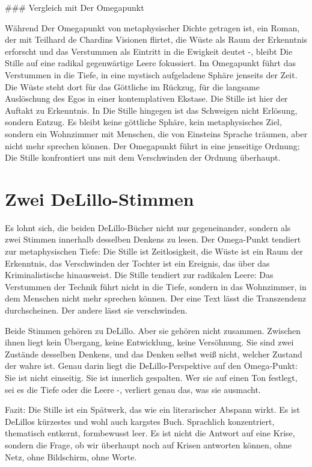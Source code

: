 \documentclass[
  ngerman,
]{article}
\begin{document}
\#\#\# Vergleich mit Der Omegapunkt

Während Der Omegapunkt von metaphysischer Dichte getragen ist, ein
Roman, der mit Teilhard de Chardins Visionen flirtet, die Wüste als Raum
der Erkenntnis erforscht und das Verstummen als Eintritt in die Ewigkeit
deutet -, bleibt Die Stille auf eine radikal gegenwärtige Leere
fokussiert. Im Omegapunkt führt das Verstummen in die Tiefe, in eine
mystisch aufgeladene Sphäre jenseits der Zeit. Die Wüste steht dort für
das Göttliche im Rückzug, für die langsame Auslöschung des Egos in einer
kontemplativen Ekstase. Die Stille ist hier der Auftakt zu Erkenntnis.
In Die Stille hingegen ist das Schweigen nicht Erlösung, sondern Entzug.
Es bleibt keine göttliche Sphäre, kein metaphysisches Ziel, sondern ein
Wohnzimmer mit Menschen, die von Einsteins Sprache träumen, aber nicht
mehr sprechen können. Der Omegapunkt führt in eine jenseitige Ordnung;
Die Stille konfrontiert uns mit dem Verschwinden der Ordnung überhaupt.

\section{Zwei DeLillo-Stimmen}\label{zwei-delillo-stimmen}

Es lohnt sich, die beiden DeLillo-Bücher nicht nur gegeneinander,
sondern als zwei Stimmen innerhalb desselben Denkens zu lesen. Der
Omega-Punkt tendiert zur metaphysischen Tiefe: Die Stille ist
Zeitlosigkeit, die Wüste ist ein Raum der Erkenntnis, das Verschwinden
der Tochter ist ein Ereignis, das über das Kriminalistische hinausweist.
Die Stille tendiert zur radikalen Leere: Das Verstummen der Technik
führt nicht in die Tiefe, sondern in das Wohnzimmer, in dem Menschen
nicht mehr sprechen können. Der eine Text lässt die Transzendenz
durchscheinen. Der andere lässt sie verschwinden.

Beide Stimmen gehören zu DeLillo. Aber sie gehören nicht zusammen.
Zwischen ihnen liegt kein Übergang, keine Entwicklung, keine Versöhnung.
Sie sind zwei Zustände desselben Denkens, und das Denken selbst weiß
nicht, welcher Zustand der wahre ist. Genau darin liegt die
DeLillo-Perspektive auf den Omega-Punkt: Sie ist nicht einseitig. Sie
ist innerlich gespalten. Wer sie auf einen Ton festlegt, sei es die
Tiefe oder die Leere -, verliert genau das, was sie ausmacht.

Fazit: Die Stille ist ein Spätwerk, das wie ein literarischer Abspann
wirkt. Es ist DeLillos kürzestes und wohl auch kargstes Buch. Sprachlich
konzentriert, thematisch entkernt, formbewusst leer. Es ist nicht die
Antwort auf eine Krise, sondern die Frage, ob wir überhaupt noch auf
Krisen antworten können, ohne Netz, ohne Bildschirm, ohne Worte.
\end{document}
